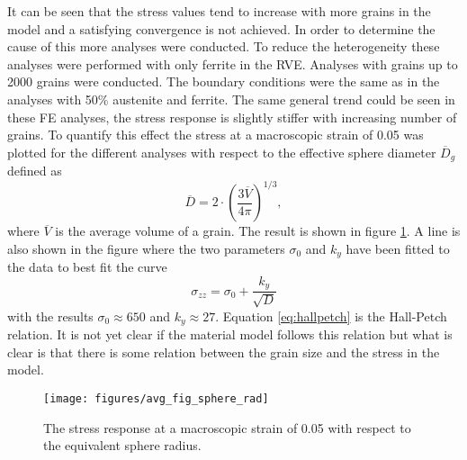 \documentclass[crystal_plast.tex]{subfiles}
\begin{document}
It can be seen that the stress values tend to increase with more grains in the model and a satisfying convergence is not achieved. In order to determine the cause of this more analyses were conducted. To reduce the heterogeneity these analyses were performed with only ferrite in the RVE. Analyses with grains up to 2000 grains were conducted. The boundary conditions were the same as in the analyses with 50\% austenite and ferrite. The same general trend could be seen in these FE analyses, the stress response is slightly stiffer with increasing number of grains. To quantify this effect the stress at a macroscopic strain of 0.05 was plotted for the different analyses with respect to the effective sphere diameter $\overline{D}_g$ defined as
\begin{equation}
 \overline{D} = 2\cdot\left( \frac{ 3\overline{V}}{4 \pi} \right)^{1/3},
\end{equation}
where $\overline{V}$ is the average volume of a grain. The result is shown in figure \ref{fig:avg_sphere_rad}. A line is also shown in the figure where the two parameters $\sigma_0$ and $k_y$ have been fitted to the data to best fit the curve
%
\begin{equation}
\label{eq:hallpetch}
 \sigma_{zz} = \sigma_0 + \frac{k_y}{\sqrt{D}}
\end{equation}
%
with the results $\sigma_0 \approx 650$ and $k_y \approx 27$. Equation \ref{eq:hallpetch} is the Hall-Petch relation. It is not yet clear if the material model follows this relation but what is clear is that there is some relation between the grain size and the stress in the model.

\begin{figure}[htpb!]
\centering
\texttt{[image: figures/avg\_fig\_sphere\_rad]}
\caption{The stress response at a macroscopic strain of 0.05 with respect to the equivalent sphere radius.}
\label{fig:avg_sphere_rad}
\end{figure}
\end{document}
